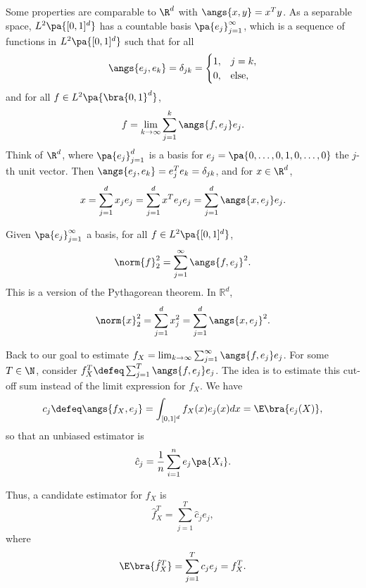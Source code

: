 \begin{enumerate}
{\color{blue}Some properties are comparable to $\R^d$ with $\angs{x,y} = x^T y$.} As a separable space, $L^2\pa{[0,1]^d}$ has a countable basis $\pa{e_j}_{j=1}^\infty$, which is a sequence of functions in $L^2\pa{[0,1]^d}$ such that for all
\begin{equation}
\angs{e_j,e_k} =\delta_{jk} = \begin{cases}
1, &j=k,\\
0, &\text{else},
\end{cases}
\end{equation}
and for all $f\in L^2\pa{\bra{0,1}^d}$,
\begin{equation}
f=\lim_{k\rightarrow\infty} \sum_{j=1}^k \angs{f,e_j} e_j.
\end{equation}
{\color{blue}Think of $\R^d$, where $\pa{e_j}_{j=1}^d$ is a basis for $e_j =\pa{0,\ldots,0,1,0,\ldots,0}$ the $j$-th unit vector. Then $\angs{e_j,e_k} = e_j^T e_k = \delta_{jk}$, and for $x\in \R^d$,
\begin{equation}
  x = \sum_{j=1}^d x_j e_j = \sum_{j=1}^d x^T e_j e_j = \sum_{j=1}^d \angs{x,e_j} e_j.
\end{equation}}

Given $\pa{e_j}_{j=1}^\infty$ a basis, for all $f\in L^2\pa{[0,1]^d}$, \begin{equation}
\norm{f}^2_2=\sum_{j=1}^\infty \angs{f,e_j}^2.
\end{equation}
This is a version of the Pythagorean theorem. {\color{blue}In $\mathbb{R}^d$,
\begin{equation}
\norm{x}^2_2 = \sum_{j=1}^d x_j^2 = \sum_{j=1}^d \angs{x,e_j}^2.
\end{equation}}

Back to our goal to estimate $f_X = \lim_{k\rightarrow \infty}\sum_{j=1}^\infty \angs{f,e_j} e_j$. For some $T\in \N$, consider $f_X^T \defeq \sum_{j=1}^T \angs{f,e_j} e_j$. The idea is to estimate this cut-off sum instead of the limit expression for $f_X$. We have
\begin{equation}
c_j \defeq \angs{f_X,e_j}=\int_{[0,1]^d}f_X(x)e_j(x)dx = \E\bra{e_j(X)},
\end{equation}
so that an unbiased estimator is
\begin{equation}
\hat{c}_j = \frac{1}{n}\sum_{i=1}^n e_j\pa{X_i}.
\end{equation}

Thus, a candidate estimator for $f_X$ is
\begin{equation}
  \hat{f}_X^T = \sum_{j=1}^T \hat{c}_j e_j,
\end{equation} where
\begin{equation}
\E\bra{\hat{f}_X^T}=\sum_{j=1}^T c_j e_j = f_X^T.
\end{equation}


\end{enumerate}
